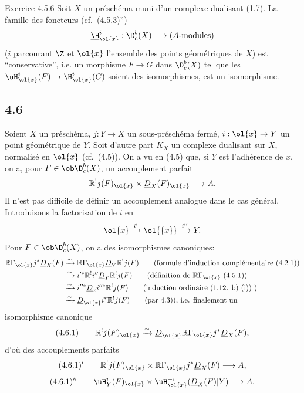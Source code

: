 \begin{statement}{Exercice 4.5.6}
Soit $X$ un préschéma muni d'un complexe dualisant (1.7). La famille des foncteurs (cf.~(4.5.3)'')
\[
\underline{\H}_{\ol{x}}^i:\D_c^b(X)\longrightarrow (A\text{-modules})
\]
($i$ parcourant $\Z$ et $\ol{x}$ l'ensemble des points géométriques de $X$) est 
``conservative'', i.e. un morphisme $F\to G$ dans $\D_c^b(X)$ tel que les $\uH_{\ol{x}}^i(F)\to\H_{\ol{x}}^i(G)$ soient des isomorphismes, est un isomorphisme.
\end{statement}

\subsection*{4.6}
Soient $X$ un préschéma, $j:Y\to X$ un sous-préschéma fermé, $i:\ol{x}\to Y$ un point géométrique de $Y$. Soit d'autre part $K_X$ un complexe dualisant sur $X$, normalisé en $\ol{x}$ (cf.~(4.5)). On a vu en (4.5) que, si $Y$ est l'adhérence de $x$, on a, pour $F\in\ob\D_c^b(X)$, un accouplement parfait
\[
\mathbb{R}^{!}j(F)_{\ol{x}}\times \underline{D}_X(F)_{\ol{x}}\longrightarrow A.
\]
Il n'est pas difficile de définir un accouplement analogue dans le cas général. Introduisons la factorisation de $i$ en
\[
\ol{x}\xrightarrow{i'}\ol{\{x\}}\xrightarrow{i''}Y.
\]
Pour $F\in\ob\D_c^b(X)$, on a des isomorphismes canoniques:
\[
\begin{aligned}
\mathbb{R}\Gamma_{\ol{x}}j^*\underline{D}_X(F)&\xrightarrow{\sim}\mathbb{R}\Gamma_{\ol{x}}\underline{D}_Y\mathbb{R}^{!}j(F)\qquad\text{(formule d'induction complémentaire (4.2.1))}\\
&\xrightarrow{\sim}i'^*\mathbb{R}^{!}i''\underline{D}_Y\mathbb{R}^{!}j(F)\qquad\text{(définition de $\mathbb{R}\Gamma_{\ol{x}}$ (4.5.1))}\\
&\xrightarrow{\sim}i''^*\underline{D}_{x}i''^*\mathbb{R}^{!}j(F)\qquad\text{(induction ordinaire (1.12. b) (i)) )}\\
&\xrightarrow{\sim}\underline{D}_{\ol{x}}i^*\mathbb{R}^{!}j(F)\qquad\text{(par 4.3)), i.e. finalement un}
\end{aligned}
\]
isomorphisme canonique
\[
(4.6.1)\qquad \mathbb{R}^{!}j(F)_{\ol{x}}\xrightarrow{\sim}\underline{D}_{\ol{x}}\mathbb{R}\Gamma_{\ol{x}}j^*\underline{D}_X(F),
\]
d'où des accouplements parfaits
\[
(4.6.1)'\qquad \mathbb{R}^{!}j(F)_{\ol{x}}\times \mathbb{R}\Gamma_{\ol{x}}j^*\underline{D}_X(F)\longrightarrow A,
\]
\[
(4.6.1)''\qquad \uH_Y^i(F)_{\ol{x}}\times \uH_{\ol{x}}^{-i}(\underline{D}_X(F)|Y)\longrightarrow A.
\]

